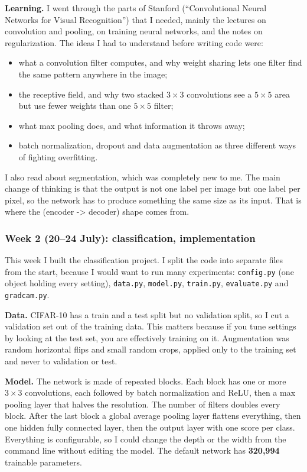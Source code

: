 \documentclass[11pt,a4paper]{article}
\begin{document}
\textbf{Learning.} I went through the parts of Stanford (``Convolutional
Neural Networks for Visual Recognition'') that I needed, mainly the lectures on
convolution and pooling, on training neural networks, and the notes on
regularization. The ideas I had to understand before writing code were:

\begin{itemize}
  \item what a convolution filter computes, and why weight sharing lets one
        filter find the same pattern anywhere in the image;
  \item the receptive field, and why two stacked $3\times3$ convolutions see a
        $5\times5$ area but use fewer weights than one $5\times5$ filter;
  \item what max pooling does, and what information it throws away;
  \item batch normalization, dropout and data augmentation as three different
        ways of fighting overfitting.
\end{itemize}

I also read about segmentation, which was completely new to me. The main
change of thinking is that the output is not one label per image but one label
per pixel, so the network has to produce something the same size as its input.
That is where the (encoder -> decoder) shape comes from.


\subsubsection*{Week 2 (20--24 July): classification, implementation}

This week I built the classification project. I split the code into separate
files from the start, because I would want to run many experiments:
\texttt{config.py} (one object holding every setting), \texttt{data.py},
\texttt{model.py}, \texttt{train.py}, \texttt{evaluate.py} and
\texttt{gradcam.py}.

\textbf{Data.} CIFAR-10 has a train and a test split but no validation split, so
I cut a validation set out of the training data. This matters because if you tune
settings by looking at the test set, you are effectively training on it.
Augmentation was random horizontal flips and small random crops, applied only to
the training set and never to validation or test.

\textbf{Model.} The network is made of repeated blocks. Each block has one or
more $3\times3$ convolutions, each followed by batch normalization and ReLU, then
a max pooling layer that halves the resolution. The number of filters doubles
every block. After the last block a global average pooling layer flattens
everything, then one hidden fully connected layer, then the output layer with one
score per class. Everything is configurable, so I could change the depth or the
width from the command line without editing the model. The default network has
\textbf{320{,}994} trainable parameters.
\end{document}
